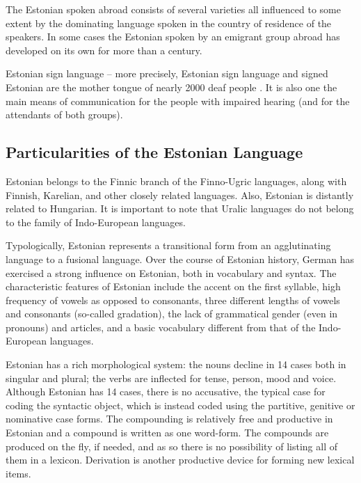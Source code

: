 \begin{multicols}{2}
The Estonian spoken abroad consists of several varieties all influenced to some extent by the dominating language spoken in the country of residence of the speakers.  In some cases the Estonian spoken by an emigrant group abroad has developed on its own for more than a century.

Estonian sign language -- more precisely, Estonian sign language and signed Estonian are the mother tongue of nearly 2000 deaf people \cite{Sign}.  It is also one the main means of communication for the people with impaired hearing (and for the attendants of both groups).

\subsection{Particularities of the Estonian Language}

Estonian belongs to the Finnic branch of the Finno-Ugric languages, along with Finnish, Karelian, and other closely related languages.  Also, Estonian is distantly related to Hungarian.  It is important to note that Uralic languages do not belong to the family of Indo-European languages.


Typologically, Estonian represents a transitional form from an agglutinating language to a fusional language.  Over the course of Estonian history, German has exercised a strong influence on Estonian, both in vocabulary and syntax.  The characteristic features of Estonian include the accent on the first syllable, high frequency of vowels as opposed to consonants, three different lengths of vowels and consonants (so-called gradation), the lack of grammatical gender (even in pronouns) and articles, and a basic vocabulary different from that of the Indo-European languages.

Estonian has a rich morphological system: the nouns decline in 14 cases both in singular and plural; the verbs are inflected for tense, person, mood and voice.  Although Estonian has 14 cases, there is no accusative, the typical case for coding the syntactic object, which is instead coded using the partitive, genitive or nominative case forms.  The compounding is relatively free and productive in Estonian and a compound is written as one word-form.  The compounds are produced on the fly, if needed, and as so there is no possibility of listing all of them in a lexicon.  Derivation is another productive device for forming new lexical items.


\end{multicols}
